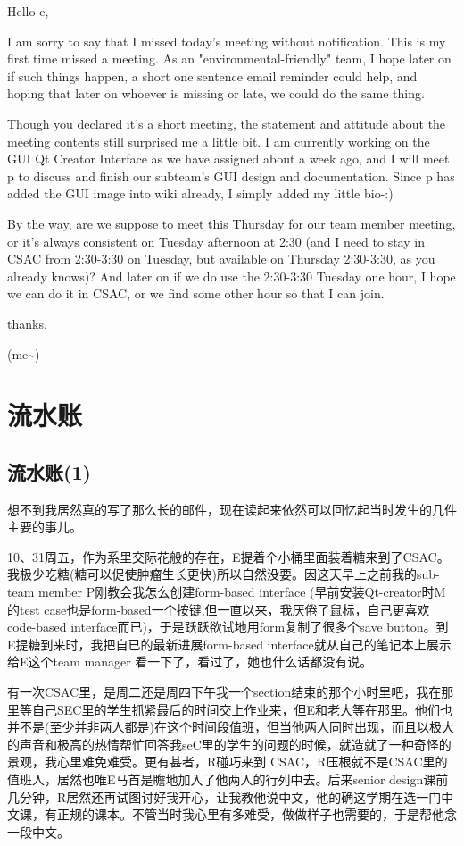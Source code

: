 \documentclass[12pt]{book}
\begin{document}
Hello e, 

I am sorry to say that I missed today's meeting without notification. This is my first time missed a meeting. As an "environmental-friendly" team, I hope later on if such things happen, a short one sentence email reminder could help, and hoping that later on whoever is missing or late, we could do the same thing. 

Though you declared it's a short meeting, the statement and attitude about the meeting contents still surprised me a little bit. I am currently working on the GUI Qt Creator Interface as we have assigned about a week ago, and I will meet p to discuss and finish our subteam's GUI design and documentation. Since p has added the GUI image into wiki already, I simply added my little bio-:)

By the way, are we suppose to meet this Thursday for our team member meeting, or it's always consistent on Tuesday afternoon at 2:30 (and I need to stay in CSAC from 2:30-3:30 on Tuesday, but available on Thursday 2:30-3:30, as you already knows)? And later on if we do use the 2:30-3:30 Tuesday one hour, I hope we can do it in CSAC, or we find some other hour so that I can join. 

thanks,

(me\textasciitilde{})

\chapter{流水账}
\label{sec-24}
\section{流水账(1)}
\label{sec-24-1}
想不到我居然真的写了那么长的邮件，现在读起来依然可以回忆起当时发生的几件主要的事儿。 

10、31周五，作为系里交际花般的存在，E提着个小桶里面装着糖来到了CSAC。我极少吃糖(糖可以促使肿瘤生长更快)所以自然没要。因这天早上之前我的sub-team member P刚教会我怎么创建form-based interface (早前安装Qt-creator时M的test case也是form-based一个按键,但一直以来，我厌倦了鼠标，自己更喜欢code-based interface而已)，于是跃跃欲试地用form复制了很多个save button。到E提糖到来时，我把自已的最新进展form-based interface就从自己的笔记本上展示给E这个team manager 看一下了，看过了，她也什么话都没有说。 

有一次CSAC里，是周二还是周四下午我一个section结束的那个小时里吧，我在那里等自己SEC里的学生抓紧最后的时间交上作业来，但E和老大等在那里。他们也并不是(至少并非两人都是)在这个时间段值班，但当他两人同时出现，而且以极大的声音和极高的热情帮忙回答我seC里的学生的问题的时候，就造就了一种奇怪的景观，我心里难免难受。更有甚者，R碰巧来到 CSAC，R压根就不是CSAC里的值班人，居然也唯E马首是瞻地加入了他两人的行列中去。后来senior design课前几分钟，R居然还再试图讨好我开心，让我教他说中文，他的确这学期在选一门中文课，有正规的课本。不管当时我心里有多难受，做做样子也需要的，于是帮他念一段中文。
\end{document}
